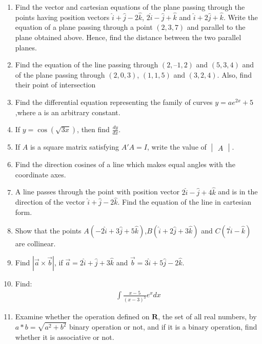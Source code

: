 \documentclass[12pt,-letter paper]{article}
\providecommand{\brak}[1]{\ensuremath{\left(#1\right)}}
\theoremstyle{remark}
\newcommand{\mydet}[1]{\ensuremath{\begin{vmatrix}#1\end{vmatrix}}}
\begin{document}
\begin{enumerate}
\item Find the vector and cartesian equations of the plane passing through the points having position vectors $\hat{i}+\hat{j}-2\hat{k}$, $2\hat{i}-\hat{j}+\hat{k}$ and $\hat{i}+2\hat{j}+\hat{k}$. Write the equation of a plane passing through a point \brak{2, 3, 7} and parallel to the plane obtained above. Hence, find the distance between the two parallel planes.

        \item Find the equation of the line passing through \brak{2, – 1, 2} and \brak{5, 3, 4} and of the plane passing through \brak{2, 0, 3}, \brak{1, 1, 5} and \brak{3, 2, 4}. Also, find
their point of intersection

\item Find the differential equation representing the family of curves ${y}=ae^{2x}+5$,where a is an arbitrary constant.

\item If ${y}=\cos\brak{\sqrt{3x}}$, then find $\frac{dy}{dx}$.

\item If $A$ is a square matrix satisfying $A'A = I$, write the value of $\mydet{A}$.

 \item Find the direction cosines of a line which makes equal angles with the coordinate axes.
 
 \item A line passes through the point with position vector $2\hat{i}-\hat{j}+4\hat{k}$ and is in the direction of the vector $\hat{i}+\hat{j}-2\hat{k}$. Find the equation of the line in cartesian form.
 \item Show that the points $A\brak{-2\hat{i}+3\hat{j}+5\hat{k}}$,$B\brak{\hat{i}+2\hat{j}+3\hat{k}}$ and $C\brak{7\hat{i}-\hat{k}}$ are collinear.
 
 \item Find $|\overrightarrow{a}\times\overrightarrow{b}|$, if $\overrightarrow{a}=2\hat{i}+\hat{j}+3\hat{k}$ and $\overrightarrow{b}=3\hat{i}+5\hat{j}-2\hat{k}$.
 
 \item Find: \begin{align*}\int{\frac{x-5}{\brak{x-3}^3}}e^x dx\end{align*}
 
 \item Examine whether the operation defined on $\textbf{R}$, the set of all real numbers, by $a *b = \sqrt{a^2+b^2}$ binary operation or not, and if it is a binary operation, find whether it is associative or not.
 

\end{enumerate}
\end{document}
